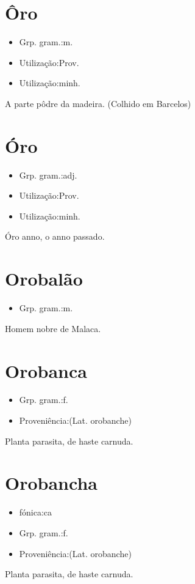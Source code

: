 \section{Ôro}
\begin{itemize}
\item {Grp. gram.:m.}
\end{itemize}
\begin{itemize}
\item {Utilização:Prov.}
\end{itemize}
\begin{itemize}
\item {Utilização:minh.}
\end{itemize}
A parte pôdre da madeira. (Colhido em Barcelos)
\section{Óro}
\begin{itemize}
\item {Grp. gram.:adj.}
\end{itemize}
\begin{itemize}
\item {Utilização:Prov.}
\end{itemize}
\begin{itemize}
\item {Utilização:minh.}
\end{itemize}
\textunderscore Óro anno\textunderscore , o anno passado.
\section{Orobalão}
\begin{itemize}
\item {Grp. gram.:m.}
\end{itemize}
Homem nobre de Malaca.
\section{Orobanca}
\begin{itemize}
\item {Grp. gram.:f.}
\end{itemize}
\begin{itemize}
\item {Proveniência:(Lat. \textunderscore orobanche\textunderscore )}
\end{itemize}
Planta parasita, de haste carnuda.
\section{Orobancha}
\begin{itemize}
\item {fónica:ca}
\end{itemize}
\begin{itemize}
\item {Grp. gram.:f.}
\end{itemize}
\begin{itemize}
\item {Proveniência:(Lat. \textunderscore orobanche\textunderscore )}
\end{itemize}
Planta parasita, de haste carnuda.
